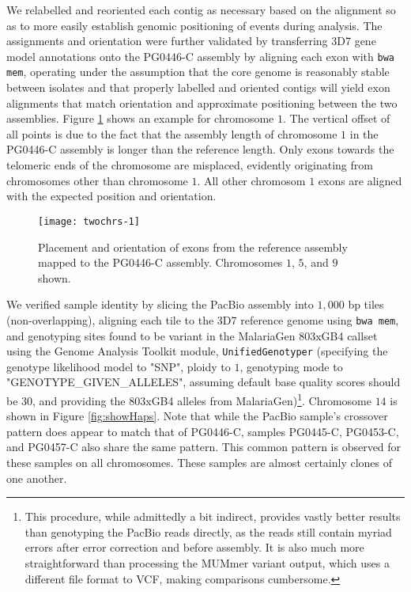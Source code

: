 We relabelled and reoriented each contig as necessary based on the alignment so as to more easily establish genomic positioning of events during analysis.  The assignments and orientation were further validated by transferring 3D7 gene model annotations onto the PG0446-C assembly by aligning each exon with \texttt{bwa mem}, operating under the assumption that the core genome is reasonably stable between isolates and that properly labelled and oriented contigs will yield exon alignments that match orientation and approximate positioning between the two assemblies.  Figure \ref{fig:loadGff} shows an example for chromosome $1$.  The vertical offset of all points is due to the fact that the assembly length of chromosome $1$ in the PG0446-C assembly is longer than the reference length.  Only exons towards the telomeric ends of the chromosome are misplaced, evidently originating from chromosomes other than chromosome $1$.  All other chromosom $1$ exons are aligned with the expected position and orientation.

\begin{figure}[h!]
  \centering
    \texttt{[image: twochrs-1]}
  \caption{Placement and orientation of exons from the reference assembly mapped to the PG0446-C assembly.  Chromosomes $1$, $5$, and $9$ shown.}
  \label{fig:loadGff}
\end{figure}

We verified sample identity by slicing the PacBio assembly into $1,000$ bp tiles (non-overlapping), aligning each tile to the 3D7 reference genome using \texttt{bwa mem}, and genotyping sites found to be variant in the MalariaGen 803xGB4 callset using the Genome Analysis Toolkit module, \texttt{UnifiedGenotyper} (specifying the genotype likelihood model to "SNP", ploidy to $1$, genotyping mode to "GENOTYPE\_GIVEN\_ALLELES", assuming default base quality scores should be $30$, and providing the 803xGB4 alleles from MalariaGen)\footnote{This procedure, while admittedly a bit indirect, provides vastly better results than genotyping the PacBio reads directly, as the reads still contain myriad errors after error correction and before assembly.  It is also much more straightforward than processing the MUMmer variant output, which uses a different file format to VCF, making comparisons cumbersome.}.  Chromosome $14$ is shown in Figure \ref{fig:showHaps}.  Note that while the PacBio sample's crossover pattern does appear to match that of PG0446-C, samples PG0445-C, PG0453-C, and PG0457-C also share the same pattern.  This common pattern is observed for these samples on all chromosomes.  These samples are almost certainly clones of one another.


